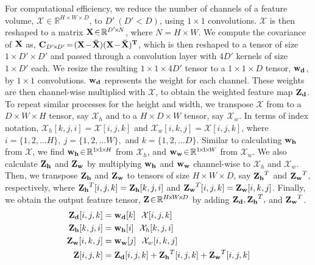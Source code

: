 For computational efficiency, we reduce the number of channels of a feature volume, $\mathcal{X} \!\in\! \mathbb{R}^{H \!\times\! W \!\times\! D}$, to $D'~(D'\!<\!D)$, using $1\!\times\!1$ convolutions. $\mathcal{X}$ is then reshaped to a matrix $\vb{X} \!\in\! \mathbb{R}^{D'\!\times\! N}$, where $N\!=\!H\!\times\! W$. We compute the covariance of $\vb{X}$ as, $\vb{C}_{D'\!\times\!D'} \!=\! (\vb{X\!-\!\bar{X}})\vb{(X\!-\!\bar{X})^T}$, which is then reshaped to a tensor of size $1 \!\times\! D' \!\times\! D'$ and passed through a convolution layer with $4D'$ kernels of size $1 \!\times\! D'$ each. We resize the resulting $1\!\times\! 1 \!\times\! 4D'$ tensor to a $1\!\times\! 1 \!\times\! D$ tensor, $\vb{w_d}$, by $1\!\times\! 1$ convolutions. $\vb{w_d}$ represents the weight for each channel. These weights are then channel-wise multiplied with $\mathcal{X}$, to obtain the weighted feature map $\vb{Z_d}$. To repeat similar processes for the height and width, we transpose $\mathcal{X}$ from to a $D \!\times\! W \!\times\! H$ tensor, say $\mathcal{X}_h$ and to a $H \!\times\! D \!\times\! W$ tensor, say $\mathcal{X}_w$. In terms of index notation, $\mathcal{X}_h[k,j,i] \!=\! \mathcal{X}[i,j,k]$ and $\mathcal{X}_w[i,k,j] \!=\! \mathcal{X}[i,j,k]$, where $i\!=\!\{1,2,\ldots H\}, ~j\!=\!\{1,2,\ldots W\},$ and $k\!=\!\{1,2,\ldots D\}$. Similar to calculating $\vb{w_h}$ from $\mathcal{X}$, we find $\vb{w_h}\!\in\! \mathbb{R}^{1\!\times\!1\!\times\!H}$ from $\mathcal{X}_h$, and $\vb{w_w}\!\in\! \mathbb{R}^{1\!\times\!1\!\times\!W}$ from $\mathcal{X}_w$. We also calculate $\vb{Z_h}$ and $\vb{Z_w}$ by multiplying $\vb{w_h}$ and $\vb{w_w}$ channel-wise to $\mathcal{X}_h$ and $\mathcal{X}_w$. Then, we transpose $\vb{Z_h}$ and $\vb{Z_w}$ to tensors of size $H\!\times\! W \!\times\! D$, say $\vb{Z_h}^T$ and $\vb{Z_w}^T$, respectively, where $\vb{Z_h}^T[i,j,k] = \vb{Z_h}[k,j,i]$ and $\vb{Z_w}^T[i,j,k] = \vb{Z_w}[i,k,j]$. Finally, we obtain the output feature tensor, $\vb{Z} \!\in\! \mathbb{R}^{H\!\times\! W \!\times\! D}$ by adding $\vb{Z_d}, \vb{Z_h}^T,$ and $\vb{Z_w}^T$. 
\vspace{-0.5em}
\begin{align}
    \vb{Z_d}[i,j,k] &= \vb{w_d}[k] ~~ \mathcal{X}[i,j,k] \\
    \vb{Z_h}[k,j,i] &= \vb{w_h}[i] ~~ \mathcal{X}_h[k,j,i]  \\
    \vb{Z_w}[i,k,j] &= \vb{w_w}[j] ~~ \mathcal{X}_w[i,k,j]  \\
    \vb{Z}[i,j,k] &= \vb{Z_d}[i,j,k] + \vb{Z_h}^T[i,j,k] + \vb{Z_w}^T[i,j,k]
\end{align}
